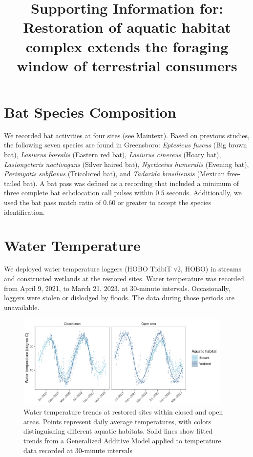\documentclass[11pt, class=article, crop=false]{standalone}
\title{Supporting Information for:\\Restoration of aquatic habitat complex extends the foraging window of terrestrial consumers}
\date{} %
\author{}
\begin{document}
\maketitle

\section*{Bat Species Composition}

We recorded bat activities at four sites (see Maintext).
Based on previous studies, the following seven species are found in Greensboro: \textit{Eptesicus fuscus} (Big brown bat), \textit{Lasiurus borealis} (Eastern red bat), \textit{Lasiurus cinereus} (Hoary bat), \textit{Lasionycteris noctivagans} (Silver haired bat), \textit{Nycticeius humeralis} (Evening bat), \textit{Perimyotis subflavus} (Tricolored bat), and \textit{Tadarida brasiliensis} (Mexican free-tailed bat).
A bat pass was defined as a recording that included a minimum of three complete bat echolocation call pulses within 0.5 seconds.
Additionally, we used the bat pass match ratio of 0.60 or greater to accept the species identification.



\section*{Water Temperature}

We deployed water temperature loggers (HOBO TidbiT v2, HOBO\textregistered) in streams and constructed wetlands at the restored sites.
Water temperature was recorded from April 9, 2021, to March 21, 2023, at 30-minute intervals.
Occasionally, loggers were stolen or dislodged by floods.
The data during those periods are unavailable.

\begin{figure}
    \centering
    \includegraphics[width=0.95\textwidth]{output/figure_w_temp.pdf}
    \caption{Water temperature trends at restored sites within closed and open areas. Points represent daily average temperatures, with colors distinguishing different aquatic habitats. Solid lines show fitted trends from a Generalized Additive Model applied to temperature data recorded at 30-minute intervals}
    \label{fig:bat-activity}
\end{figure}


% 
\end{document}
